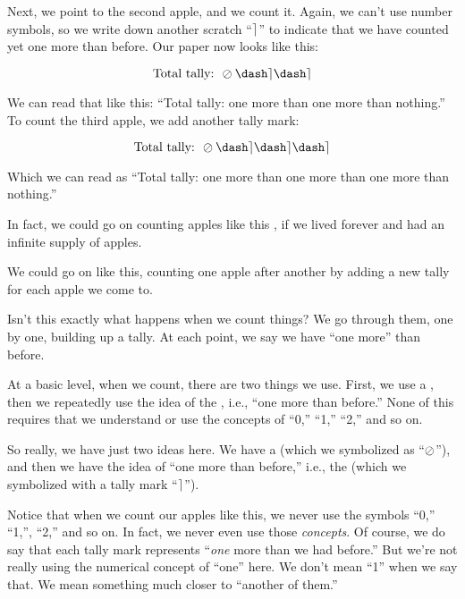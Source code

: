 \documentclass[../../../main.tex]{subfiles}
\begin{document}
Next, we point to the second apple, and we count it. Again, we can't use number symbols, so we write down another scratch ``$\tally/$'' to indicate that we have counted yet one more than before. Our paper now looks like this:

\begin{equation*}
  \text{Total tally: } \nought/\dash\tally/\dash\tally/
\end{equation*}

We can read that like this: ``Total tally: one more than one more than nothing.'' To count the third apple, we add another tally mark:

\begin{equation*}
  \text{Total tally: } \nought/\dash\tally/\dash\tally/\dash\tally/
\end{equation*}

Which we can read as ``Total tally: one more than one more than one more than nothing.''

\begin{aside}
  \begin{remark}
    In fact, we could go on counting apples like this , if we lived forever and had an infinite supply of apples.
  \end{remark}
\end{aside}

We could go on like this, counting one apple after another by adding a new tally for each apple we come to.

Isn't this exactly what happens when we count things? We go through them, one by one, building up a tally. At each point, we say we have ``one more'' than before. 

\begin{terminology}
  At a basic level, when we count, there are two things we use. First, we use a , then we repeatedly use the idea of the , i.e., ``one more than before.'' None of this requires that we understand or use the concepts of ``0,'' ``1,'' ``2,'' and so on.
\end{terminology}

So really, we have just two ideas here. We have a  (which we symbolized as ``$\nought/$''), and then we have the idea of ``one more than before,'' i.e., the  (which we symbolized with a tally mark ``$\tally/$'').

Notice that when we count our apples like this, we never use the symbols ``0,'' ``1,'', ``2,'' and so on. In fact, we never even use those \emph{concepts}. Of course, we do say that each tally mark represents ``\emph{one} more than we had before.'' But we're not really using the numerical concept of ``one'' here. We don't mean ``1'' when we say that. We mean something much closer to ``another of them.''
\end{document}
